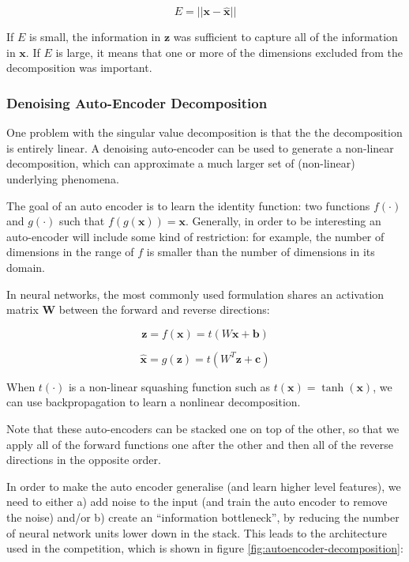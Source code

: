 \documentclass{article}
\begin{document}
\begin{equation}
\label{eqn:decomp-error}
E = || \mathbf{x - \hat{x}} ||
\end{equation}

If $E$ is small, the information in $\mathbf{z}$ was sufficient to capture all of the information in $\mathbf{x}$.  If $E$ is large, it means that one or more of the dimensions excluded from the decomposition was important.


\subsubsection{Denoising Auto-Encoder Decomposition}

One problem with the singular value decomposition is that the the decomposition is entirely linear.  A denoising auto-encoder \cite{Vincent-TR1316} can be used to generate a non-linear decomposition, which can approximate a much larger set of (non-linear) underlying phenomena.

The goal of an auto encoder is to learn the identity function: two functions $f(\cdot)$ and $g(\cdot)$ such that $f(g(\mathbf{x})) = \mathbf{x}$.  Generally, in order to be interesting an auto-encoder will include some kind of restriction: for example, the number of dimensions in the range of $f$ is smaller than the number of dimensions in its domain.

In neural networks, the most commonly used formulation shares an activation matrix $\mathbf{W}$ between the forward and reverse directions:

\begin{equation}
\label{eqn:autoencoder-encode}
\mathbf{z} = f(\mathbf{x}) = t(W\mathbf{x} + \mathbf{b})
\end{equation}

\begin{equation}
\label{eqn:autoencoder-decode}
\hat{\mathbf{x}} = g(\mathbf{z}) = t(W^T\mathbf{z} + \mathbf{c})
\end{equation}

When $t(\cdot)$ is a non-linear squashing function such as $t(\mathbf{x}) = \tanh(\mathbf{x})$, we can use backpropagation to learn a nonlinear decomposition.

Note that these auto-encoders can be stacked one on top of the other, so that we apply all of the forward functions one after the other and then all of the reverse directions in the opposite order.

In order to make the auto encoder generalise (and learn higher level features), we need to either a) add noise to the input (and train the auto encoder to remove the noise) and/or b) create an ``information bottleneck'', by reducing the number of neural network units lower down in the stack.  This leads to the architecture used in the competition, which is shown in figure \ref{fig:autoencoder-decomposition}:
\end{document}
